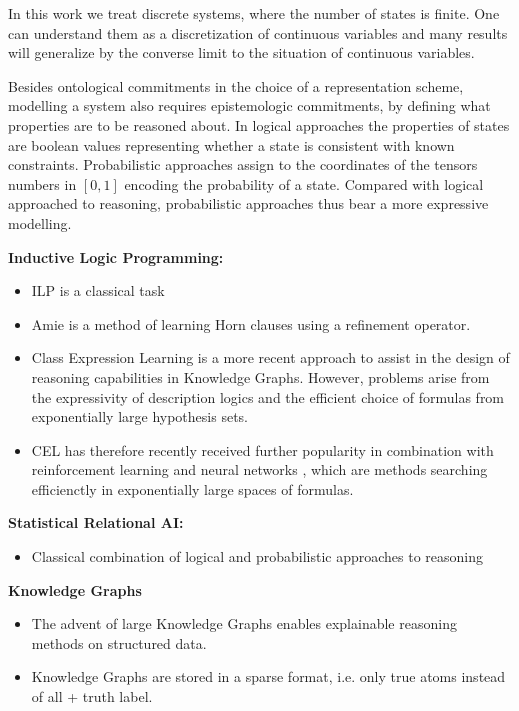 In this work we treat discrete systems, where the number of states is finite.
One can understand them as a discretization of continuous variables and many results will generalize by the converse limit to the situation of continuous variables.

Besides ontological commitments in the choice of a representation scheme, modelling a system also requires epistemologic commitments, by defining what properties are to be reasoned about.
In logical approaches the properties of states are boolean values representing whether a state is consistent with known constraints.
Probabilistic approaches assign to the coordinates of the tensors numbers in $[0,1]$ encoding the probability of a state.
Compared with logical approached to reasoning, probabilistic approaches thus bear a more expressive modelling.


\textbf{Inductive Logic Programming:}
\begin{itemize}
    \item ILP is a classical task \cite{muggleton_inductive_1994}
    \item Amie \cite{galarraga_amie_2013} is a method of learning Horn clauses using a refinement operator.
    \item Class Expression Learning \cite{lehmann_class_2011} is a more recent approach to assist in the design of reasoning capabilities in Knowledge Graphs.
        However, problems arise from the expressivity of description logics and the efficient choice of formulas from exponentially large hypothesis sets.
    \item CEL has therefore recently received further popularity in combination with reinforcement learning \cite{demir_drill-_2021} and neural networks \cite{kouagou_neural_2022, pesquita_neural_2023}, which are methods searching efficienctly in exponentially large spaces of formulas.
\end{itemize}

\textbf{Statistical Relational AI:}
\begin{itemize}
    \item Classical combination of logical and probabilistic approaches to reasoning \cite{getoor_introduction_2019}
\end{itemize}

\textbf{Knowledge Graphs}
\begin{itemize}
    \item The advent of large Knowledge Graphs enables explainable reasoning methods on structured data. \cite{antoniou_semantic_2012,hogan_knowledge_2021}
    \item Knowledge Graphs are stored in a sparse format, i.e. only true atoms instead of all + truth label.
\end{itemize}


